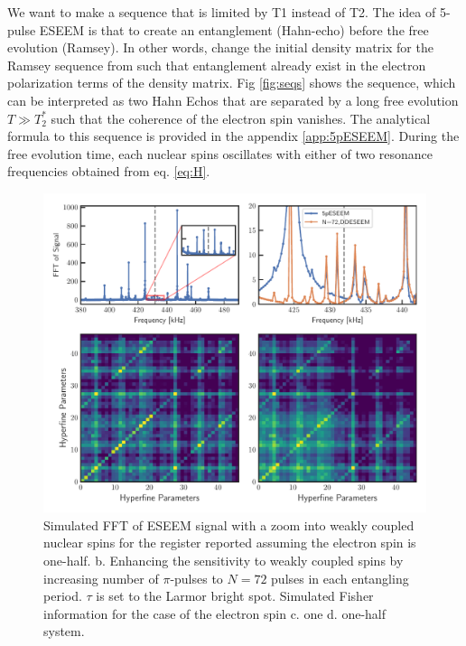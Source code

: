 \documentclass[%
 reprint,
superscriptaddress,
 amsmath,amssymb,
 aps,
]{revtex4-2}
\begin{document}
   
We want to make a sequence that is limited by T1 instead of T2. The idea of 5-pulse ESEEM \cite{kasumaj20085} is that to create an entanglement (Hahn-echo) before the free evolution (Ramsey). In other words, change the initial density matrix for the Ramsey sequence from such that entanglement already exist in the electron polarization terms of the density matrix. Fig \ref{fig:seqs} shows the sequence, which can be interpreted as two Hahn Echos that are separated by a long free evolution $T\gg T_2^\ast$ such that the coherence of the electron spin vanishes. The analytical formula to this sequence is provided in the appendix \ref{app:5pESEEM}. During the free evolution time, each nuclear spins oscillates with either of two resonance frequencies obtained from eq. \ref{eq:H}.
\begin{figure}[htbp]
	\begin{center}
		\includegraphics[width=0.9\columnwidth]{pict/eseem_compare2.pdf}
		\caption{Simulated FFT of ESEEM signal with a zoom into weakly coupled nuclear spins for the register reported \cite{abobeih2019atomic} assuming the electron spin is one-half. b. Enhancing the sensitivity to weakly coupled spins by increasing number of $\pi$-pulses to $N=72$ pulses in each entangling period. $\tau$ is set to the Larmor bright spot. Simulated Fisher information for the case of the electron spin c. one d. one-half system.}
		\label{fig:4}
	\end{center}
\end{figure}
\end{document}
